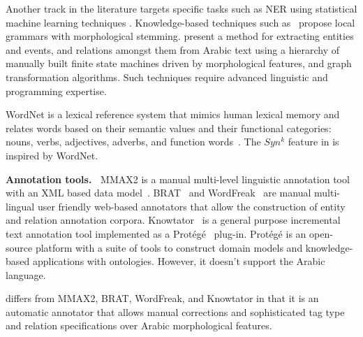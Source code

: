 Another track in the literature targets specific tasks such as NER using statistical machine learning techniques \cite{benajiba2007anersys,benajiba2008arabic,ekbal2010named,abdelrahman2010integrated}.
Knowledge-based techniques such 
as~\cite{zaghouani2010adapting,traboulsi2009arabic} propose local grammars with morphological stemming.%
\cite{ZaMaHaCicling2012Entity} present a method for extracting entities and events, and relations amongst them from Arabic text using a hierarchy of manually built 
finite state machines driven by morphological features, 
and graph transformation algorithms. 
Such techniques require advanced linguistic and programming expertise. 

WordNet is a lexical reference system that mimics human lexical memory 
and relates words based on their semantic values and their functional 
categories: nouns, verbs, adjectives, adverbs, and function words~\cite{intro}.
The $Syn^k$ feature in \framework is inspired by WordNet.

{\bf Annotation tools.~}
MMAX2 is a manual multi-level linguistic annotation tool with an XML 
based data model~\cite{mmax2}.
BRAT~\cite{brat} and WordFreak~\cite{wordfreak} are manual 
multi-lingual user friendly web-based annotators that allow the construction 
of entity and relation annotation corpora.
Knowtator~\cite{ogren2006knowtator} is a general purpose incremental text annotation tool 
implemented as a Prot\'eg\'e~\cite{gennari2003evolution} plug-in. 
Prot\'eg\'e is an open-source platform with a suite of tools to construct domain models and knowledge-based applications with ontologies. 
However, it doesn't support the Arabic language.

\framework differs from MMAX2, BRAT, WordFreak, and Knowtator in that it is 
an automatic annotator that allows manual corrections 
and sophisticated tag type and relation specifications over
Arabic morphological features.

